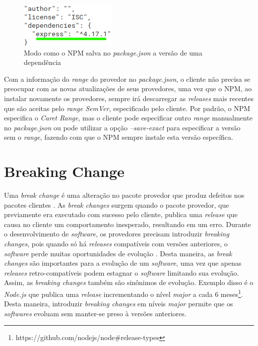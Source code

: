 \begin{figure}
    \centering
    \includegraphics{figuras/dependencies_express.png}
    \caption{Modo como o \gls{NPM} salva no \textit{package.json} a versão de uma dependência}
    \label{fig:dep_express}
\end{figure}{}

Com a informação do \textit{range} do provedor no \textit{package.json}, o cliente não precisa se preocupar com as novas atualizações de seus provedores, uma vez que o \gls{NPM}, ao instalar novamente os provedores, sempre irá descarregar as \textit{releases} mais recentes que são aceitas pelo \textit{range SemVer}, especificado pelo cliente. Por padrão, o \gls{NPM} especifica o \textit{Caret Range}, mas o cliente pode especificar outro \textit{range} manualmente no \textit{package.json} ou pode utilizar a opção \textit{--save-exact} para especificar a versão sem o \textit{range}, fazendo com que o \gls{NPM} sempre instale esta versão específica.

\section{Breaking Change}
\label{ref-teo:breaking_change}
Uma \textit{break change} é uma alteração no pacote provedor que produz defeitos nos pacotes clientes \cite{teorical_reference:semver}. As \textit{break changes} surgem quando o pacote provedor, que previamente era executado com sucesso pelo cliente, publica uma \textit{release} que causa no cliente um comportamento inesperado, resultando em um erro. Durante o desenvolvimento de \textit{software}, os provedores precisam introduzir \textit{breaking changes}, pois quando só há \textit{releases} compatíveis com versões anteriores, o \textit{software} perde muitas oportunidades de evolução \cite{teorical_reference:bc_2}. Desta maneira, as \textit{break changes} são importantes para a evolução de um \textit{software}, uma vez que apenas \textit{releases} retro-compatíveis podem estagnar o \textit{software} limitando sua evolução. Assim, as \textit{breaking changes} também são sinônimos de evolução. Exemplo disso é o \textit{Node.js} que publica uma \textit{release} incrementando o nível \textit{major} a cada 6 meses\footnote{https://github.com/nodejs/node\#release-types}. Desta maneira, introduzir \textit{breaking changes} em níveis \textit{major} permite que os \textit{softwares} evoluam sem manter-se preso à versões anteriores.

